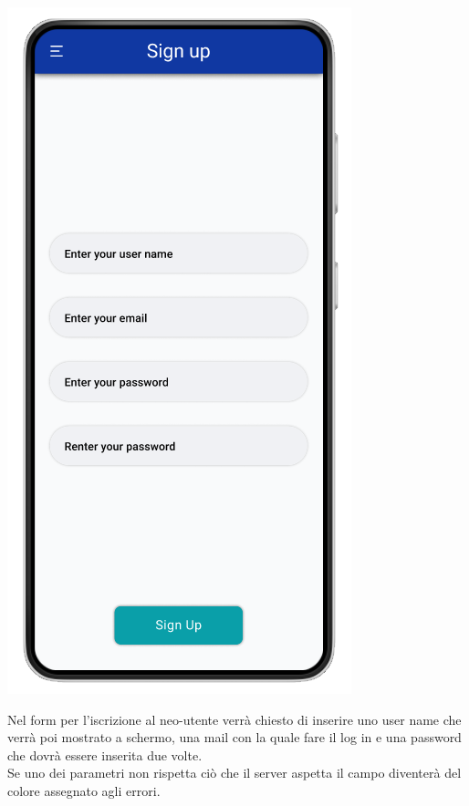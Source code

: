 \documentclass{report}
\begin{document}
\begin{center}
   \includegraphics[scale=0.4]{sign_up.png}
\end{center}

Nel form per l'iscrizione al neo-utente verrà chiesto di inserire uno user name che verrà poi mostrato a schermo, una mail con la quale fare il log in e una password che dovrà essere inserita due volte.\\
Se uno dei parametri non rispetta ciò che il server aspetta il campo diventerà del colore assegnato agli errori.

\printbibliography
\end{document}
